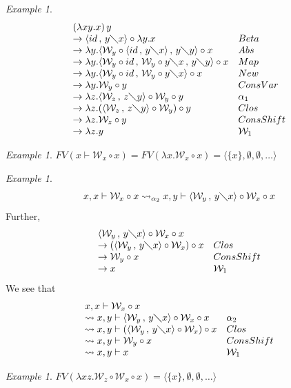 \documentclass[11pt]{amsart}
\theoremstyle{plain}
\theoremstyle{definition}
\theoremstyle{remark}
\newtheorem{example}[theorem]{Example}
\numberwithin{equation}{section}
\newcommand{\ci}{\circ}
\newcommand{\ri}{\rightsquigarrow}
\newcommand{\mi}{\,,\,}
\newcommand{\is}{\diagdown}
\newcommand{\la}{\langle}
\newcommand{\ra}{\rangle}
\renewcommand{\pi}{\mathcal{W}}
\begin{document}
\begin{example}$$\begin{array}{ll}
(\lambda x y.x)\,y & \\
\rightarrow \langle id\mi y\is x\rangle\ci\lambda y.x &
Beta\\
\rightarrow\lambda y.\langle\pi_y\ci\langle id\mi y\is x\rangle\mi
y\is y\rangle\ci x & Abs\\
 \rightarrow\lambda
y.\langle\pi_y\ci id\mi \pi_y\ci y\is x\mi y\is y\rangle\ci x &
Map\\
\rightarrow\lambda y.\langle\pi_y\ci id\mi
\pi_y\ci y\is x\rangle\ci x & New\\
 \rightarrow
\lambda y.\pi_y\ci y & ConsVar\\
\rightarrow\lambda z.\langle\pi_z\mi z\is y\rangle\ci \pi_y\ci y &
\alpha_1\\
\rightarrow\lambda z.(\langle\pi_z\mi z\is y\rangle\ci \pi_y)\ci y
 & Clos\\
 \rightarrow\lambda z.\pi_z\ci
y & ConsShift\\
\rightarrow\lambda z.y & \pi_1
\end{array}$$
\end{example}
\begin{example}
$FV(x\vdash\pi_x\ci x)=FV(\lambda x.\pi_x\ci
x)=\la\{x\},\emptyset,\emptyset,\ldots\ra$
\end{example}
\begin{example}
$$ x,x\vdash \pi_x\ci x \ri_{\alpha_2} x,y\vdash\langle\pi_y\mi
y\is x\rangle\ci \pi_x\ci x$$
 Further,
 $$\begin{array}{ll}
 \langle \pi_y\mi y\is
x\rangle\ci \pi_x\ci x & \\
\rightarrow (\langle \pi_y\mi y\is x\rangle\ci \pi_x)\ci x &
Clos\\
\rightarrow \pi_y\ci x & ConsShift\\
\rightarrow x & \pi_1 \end{array}$$
 We see that
$$\begin{array}{ll}
 x,x\vdash \pi_x\ci
x & \\
\ri x,y\vdash\langle\pi_y\mi y\is x\rangle\ci \pi_x\ci x &
\alpha_2\\
\ri x,y\vdash (\langle \pi_y\mi y\is x\rangle\ci \pi_x)\ci x &
Clos\\
\ri x,y\vdash \pi_y\ci x & ConsShift\\
\ri x,y\vdash x & \pi_1
\end{array}$$
\end{example}
\begin{example}
$FV(\lambda x z.\pi_z\ci\pi_x\ci
x)=\la\{x\},\emptyset,\emptyset,\ldots\ra$
\end{example}
\end{document}
